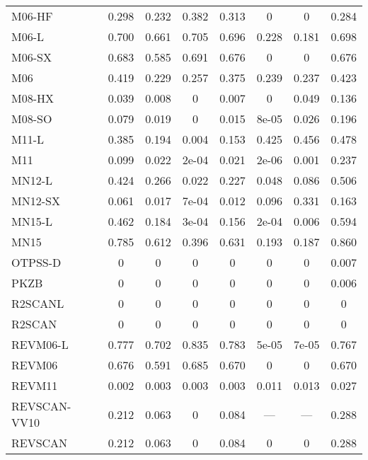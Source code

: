 \begin{table*}
\begin{tabular}{|l|c|c|c|c|c|c|c|}
M06-HF~\cite{Zhao2006_13126} & 0.298 & 0.232 & 0.382 & 0.313 & 0 & 0 & 0.284 \\
M06-L~\cite{Zhao2006_194101,Zhao2008_215} & 0.700 & 0.661 & 0.705 & 0.696 & 0.228 & 0.181 & 0.698 \\
M06-SX~\cite{Wang2020_2294} & 0.683 & 0.585 & 0.691 & 0.676 & 0 & 0 & 0.676 \\
M06~\cite{Zhao2008_215} & 0.419 & 0.229 & 0.257 & 0.375 & 0.239 & 0.237 & 0.423 \\
M08-HX~\cite{Zhao2008_1849} & 0.039 & 0.008 & 0 & 0.007 & 0 & 0.049 & 0.136 \\
M08-SO~\cite{Zhao2008_1849} & 0.079 & 0.019 & 0 & 0.015 & 8e-05 & 0.026 & 0.196 \\
M11-L~\cite{Peverati2012_117} & 0.385 & 0.194 & 0.004 & 0.153 & 0.425 & 0.456 & 0.478 \\
M11~\cite{Peverati2011_2810} & 0.099 & 0.022 & 2e-04 & 0.021 & 2e-06 & 0.001 & 0.237 \\
MN12-L~\cite{Peverati2012_13171} & 0.424 & 0.266 & 0.022 & 0.227 & 0.048 & 0.086 & 0.506 \\
MN12-SX~\cite{Peverati2012_16187} & 0.061 & 0.017 & 7e-04 & 0.012 & 0.096 & 0.331 & 0.163 \\
MN15-L~\cite{Yu2016_1280} & 0.462 & 0.184 & 3e-04 & 0.156 & 2e-04 & 0.006 & 0.594 \\
MN15~\cite{Yu2016_5032} & 0.785 & 0.612 & 0.396 & 0.631 & 0.193 & 0.187 & 0.860 \\
OTPSS-D~\cite{Goerigk2010_107} & 0 & 0 & 0 & 0 & 0 & 0 & 0.007 \\
PKZB~\cite{Perdew1999_2544} & 0 & 0 & 0 & 0 & 0 & 0 & 0.006 \\
R2SCANL~\cite{Mejia2020_121109,Furness2020_8208,Furness2020_9248} & 0 & 0 & 0 & 0 & 0 & 0 & 0 \\
R2SCAN~\cite{Furness2020_8208,Furness2020_9248} & 0 & 0 & 0 & 0 & 0 & 0 & 0 \\
REVM06-L~\cite{Wang2017_8487} & 0.777 & 0.702 & 0.835 & 0.783 & 5e-05 & 7e-05 & 0.767 \\
REVM06~\cite{Wang2018_10257} & 0.676 & 0.591 & 0.685 & 0.670 & 0 & 0 & 0.670 \\
REVM11~\cite{Verma2019_2966} & 0.002 & 0.003 & 0.003 & 0.003 & 0.011 & 0.013 & 0.027 \\
REVSCAN-VV10~\cite{Mezei2018_2469} & 0.212 & 0.063 & 0 & 0.084 & --- & --- & 0.288 \\
REVSCAN~\cite{Mezei2018_2469} & 0.212 & 0.063 & 0 & 0.084 & 0 & 0 & 0.288 \\

\end{tabular}
\end{table*}
